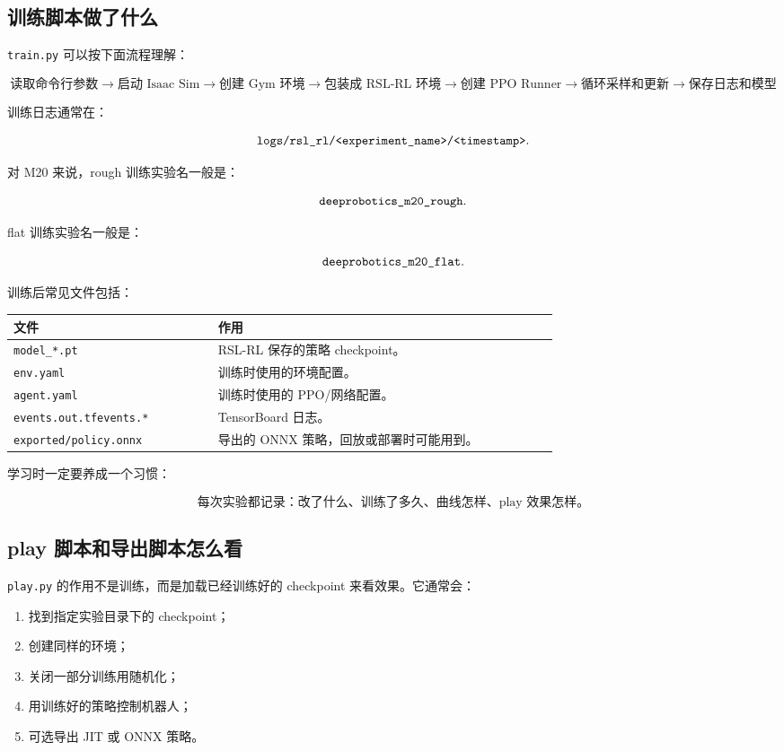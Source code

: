 \documentclass[UTF8,11pt,a4paper]{ctexart}
\begin{document}
\subsection{训练脚本做了什么}

\texttt{train.py} 可以按下面流程理解：

\[
\boxed{
\text{读取命令行参数}
\rightarrow
\text{启动 Isaac Sim}
\rightarrow
\text{创建 Gym 环境}
\rightarrow
\text{包装成 RSL-RL 环境}
\rightarrow
\text{创建 PPO Runner}
\rightarrow
\text{循环采样和更新}
\rightarrow
\text{保存日志和模型}
}
\]

训练日志通常在：

\[
\text{\texttt{logs/rsl\_rl/<experiment\_name>/<timestamp>}}.
\]

对 M20 来说，rough 训练实验名一般是：

\[
\text{\texttt{deeprobotics\_m20\_rough}}.
\]

flat 训练实验名一般是：

\[
\text{\texttt{deeprobotics\_m20\_flat}}.
\]

训练后常见文件包括：

\begin{center}
\begin{tabular}{p{0.30\linewidth}p{0.50\linewidth}}
\toprule
文件 & 作用 \\
\midrule
\texttt{model\_*.pt} & RSL-RL 保存的策略 checkpoint。\\
\texttt{env.yaml} & 训练时使用的环境配置。\\
\texttt{agent.yaml} & 训练时使用的 PPO/网络配置。\\
\texttt{events.out.tfevents.*} & TensorBoard 日志。\\
\texttt{exported/policy.onnx} & 导出的 ONNX 策略，回放或部署时可能用到。\\
\bottomrule
\end{tabular}
\end{center}

学习时一定要养成一个习惯：

\[
\boxed{
\text{每次实验都记录：改了什么、训练了多久、曲线怎样、play 效果怎样。}
}
\]

\subsection{play 脚本和导出脚本怎么看}

\texttt{play.py} 的作用不是训练，而是加载已经训练好的 checkpoint 来看效果。它通常会：

\begin{enumerate}
  \item 找到指定实验目录下的 checkpoint；
  \item 创建同样的环境；
  \item 关闭一部分训练用随机化；
  \item 用训练好的策略控制机器人；
  \item 可选导出 JIT 或 ONNX 策略。
\end{enumerate}
\end{document}
